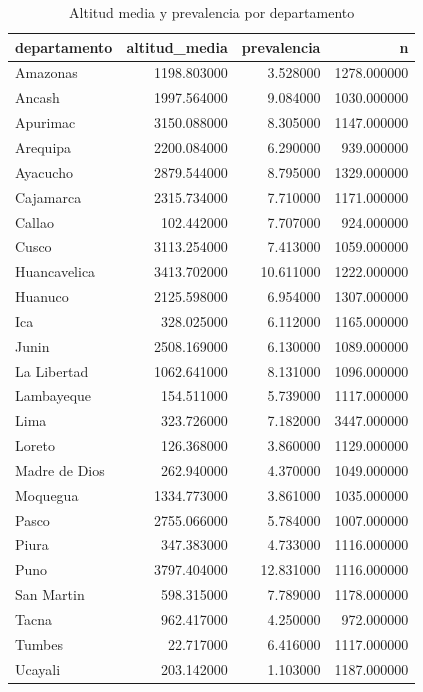 \begin{table}[htbp]
\caption{Altitud media y prevalencia por departamento}
\label{tab:tabla_41_altitud_departamento}
\begin{tabular}{lrrr}
\toprule
departamento & altitud\_media & prevalencia & n \\
\midrule
Amazonas & 1198.803000 & 3.528000 & 1278.000000 \\
Ancash & 1997.564000 & 9.084000 & 1030.000000 \\
Apurimac & 3150.088000 & 8.305000 & 1147.000000 \\
Arequipa & 2200.084000 & 6.290000 & 939.000000 \\
Ayacucho & 2879.544000 & 8.795000 & 1329.000000 \\
Cajamarca & 2315.734000 & 7.710000 & 1171.000000 \\
Callao & 102.442000 & 7.707000 & 924.000000 \\
Cusco & 3113.254000 & 7.413000 & 1059.000000 \\
Huancavelica & 3413.702000 & 10.611000 & 1222.000000 \\
Huanuco & 2125.598000 & 6.954000 & 1307.000000 \\
Ica & 328.025000 & 6.112000 & 1165.000000 \\
Junin & 2508.169000 & 6.130000 & 1089.000000 \\
La Libertad & 1062.641000 & 8.131000 & 1096.000000 \\
Lambayeque & 154.511000 & 5.739000 & 1117.000000 \\
Lima & 323.726000 & 7.182000 & 3447.000000 \\
Loreto & 126.368000 & 3.860000 & 1129.000000 \\
Madre de Dios & 262.940000 & 4.370000 & 1049.000000 \\
Moquegua & 1334.773000 & 3.861000 & 1035.000000 \\
Pasco & 2755.066000 & 5.784000 & 1007.000000 \\
Piura & 347.383000 & 4.733000 & 1116.000000 \\
Puno & 3797.404000 & 12.831000 & 1116.000000 \\
San Martin & 598.315000 & 7.789000 & 1178.000000 \\
Tacna & 962.417000 & 4.250000 & 972.000000 \\
Tumbes & 22.717000 & 6.416000 & 1117.000000 \\
Ucayali & 203.142000 & 1.103000 & 1187.000000 \\
\bottomrule
\end{tabular}
\end{table}

